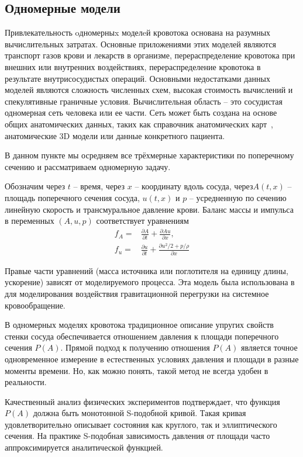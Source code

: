 \subsection{Одномерные модели}

Привлекательность oдномерныx моделeй кровотока основана на разумных вычислительных затратах. 
Основные приложениями этих моделей являются транспорт газов крови и лекарств в организме, перераспределение кровотока при внешних 
или внутренних воздействиях, перераспределение кровотока в результате внутрисосудистых операций. Основными недостатками данных моделей 
являются сложность численных схем, высокая стоимость вычислений и спекулятивные граничные условия. 
Вычислительная область -- это сосудистая одномерная сеть человека или ее части. 
Сеть может быть создана на основе общих анатомических данных, таких как справочник анатомических карт~\cite{bunicheva:2013}, 
анатомические 3D модели или данные конкретного пациента.

В данном пункте мы осредняем все трёхмерные характеристики по поперечному сечению и рассматриваем одномерную задачу.

Обозначим через $t$ -- время, через $x$ -- координату вдоль сосуда, через$A(t, x)$ -- площадь поперечного сечения сосуда, 
$u(t, x)$ и $p$ -- усредненную по сечению линейную скорость и трансмуральное давление крови. Баланс массы и импульса в переменных 
$(A, u, p)$ соответствует уравнениям
\begin{align}
    \label{eq:mass-balance}
    f_A=&\frac{\partial A}{\partial t}+\frac{\partial Au}{\partial x},\\
    \label{eq:momentum-balance}
    f_u=&\frac{\partial u}{\partial t}+ \frac{\partial u^2/2+p/\rho}{\partial x}
\end{align}

Правые части уравнений (масса источника или поглотителя на единицу длины, ускорение) зависят от моделируемого процесса. 
Эта модель была использована в~\cite{bunicheva:2004} для моделирования воздействия гравитационной перегрузки на системное кровообращение. 

В одномерных моделях кровотока традиционное описание упругих свойств стенки сосуда обеспечивается отношением давления к площади 
поперечного сечения $P(A)$. Прямой подход к получению отношения $P(A)$ является точное одновременное измерение в естественных 
условиях давления и площади в разные моменты времени. Но, как можно понять, такой метод не всегда удобен в реальности.

Качественный анализ физических экспериментов подтверждает, что функция $P(A)$ должна быть монотонной S-подобной кривой. 
Такая кривая удовлетворительно описывает  состояния как круглого, так и эллиптического сечения. 
На практике S-подобная зависимость давления от площади часто аппроксимируется аналитической функцией. 


